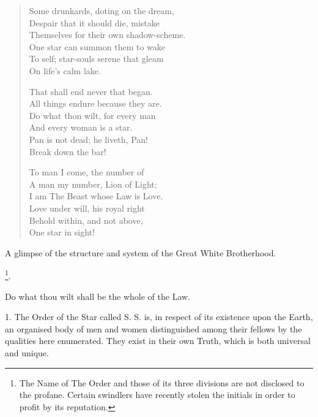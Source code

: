 \begin{verse}
  Some drunkards, doting on the dream, \\
  \hspace{1em}Despair that it should die, mistake \\
  Themselves for their own shadow-scheme. \\
  \hspace{1em}One star can summon them to wake \\
  To self; star-souls serene that gleam \\
  \hspace{1em}On life's calm lake.

  That shall end never that began. \\
  \hspace{1em}All things endure because they are. \\
  Do what thon wilt, for every man \\
  \hspace{1em}And every woman is a star. \\
  Pan is not dead; he liveth, Pan! \\
  \hspace{1em}Break down the bar!

  To man I come, the number of \\
  \hspace{1em}A man my number, Lion of Light; \\
  I am The Beast whose Law is Love. \\
  \hspace{1em}Love under will, his royal right \textemdash{} \\
  Behold within, and not above, \\
  \hspace{1em}One star in sight!
\end{verse}


A glimpse of the structure and system of the Great White Brotherhood.

\begin{center}
  \Argentium{}\footnote{The Name of The Order and those of its three divisions are not disclosed to the profane. Certain swindlers have recently stolen the initials \Argentium{} in order to profit by its reputation.}.
\end{center}

Do what thou wilt shall be the whole of the Law.

1. The Order of the Star called S. S. is, in respect of its existence upon the Earth, an organised body of men and women distinguished among their fellows by the qualities here enumerated. They exist in their own Truth, which is both universal and unique.

